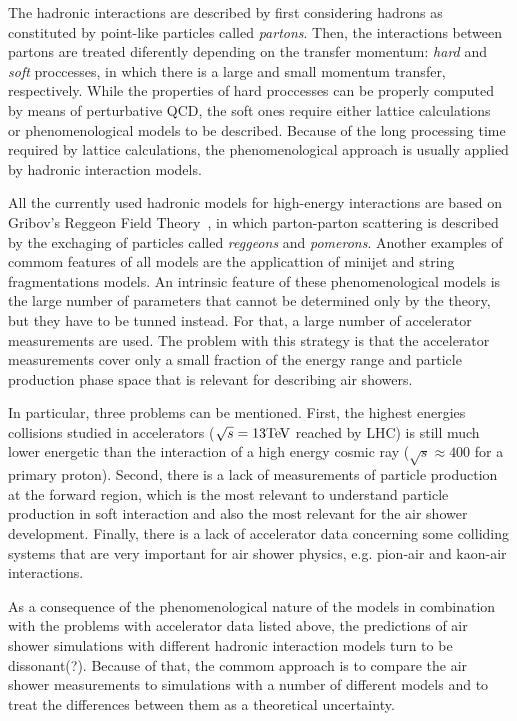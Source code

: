 The hadronic interactions are described by first considering hadrons as constituted
by point-like particles called \emph{partons}. Then, the interactions between partons
are treated diferently depending on the transfer momentum: \emph{hard} and \emph{soft}
proccesses, in which there is a large and small momentum transfer, respectively.
While the properties of hard proccesses can be properly computed by means of
perturbative QCD, the soft ones require either lattice calculations~\cite{}
or phenomenological models to be described. Because of the long processing time
required by lattice calculations, the phenomenological approach
is usually applied by hadronic interaction models.

All the currently used hadronic models for high-energy interactions
are based on Gribov's Reggeon Field Theory~\cite{Gribov1968,Drescher:2000ha}, in which
parton-parton scattering is described by the exchaging of particles
called \emph{reggeons} and \emph{pomerons}. Another examples of commom features
of all models are the applicattion of minijet and string fragmentations models.
An intrinsic feature of these phenomenological models is the large number of parameters
that cannot be determined only by the theory, but they have to be tunned instead.
For that, a large number of accelerator measurements are used. The problem with this
strategy is that the accelerator measurements cover only a small fraction
of the energy range and particle production phase space that is relevant
for describing air showers. 

In particular, three problems can be mentioned.
First, the highest energies collisions studied in accelerators
($\sqrt{s} = 13 \mbox{Te\kern-0.1em V}$ reached by LHC) is still much lower
energetic than the interaction of a high energy cosmic ray ($\sqrt{s}\approx 400$ for
a  primary proton). Second, there is a lack of measurements
of particle production at the forward region, which is the most relevant
to understand particle production in soft interaction and also
the most relevant for the air shower development. Finally,
there is a lack of accelerator data concerning some colliding systems
that are very important for air shower physics,
e.g. pion-air and kaon-air interactions.

As a consequence of the phenomenological nature of the models
in combination with the problems with accelerator data listed above,
the predictions of air shower simulations with different hadronic
interaction models turn to be dissonant(?). Because of that,
the commom approach is to compare the air shower measurements to
simulations with a number of different models and to treat
the differences between them as a theoretical uncertainty. 

